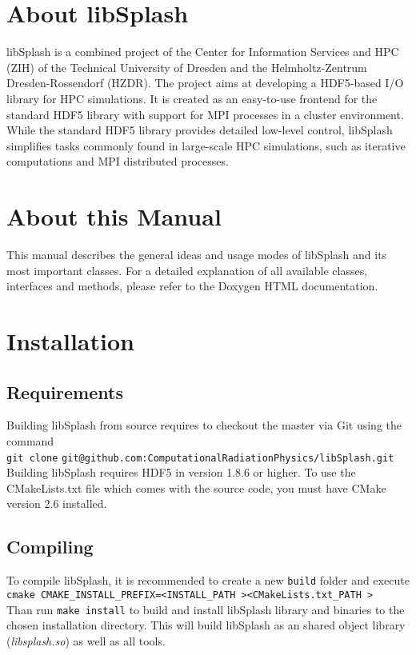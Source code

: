 \documentclass[a4paper,10pt,BCOR12mm]{report}
\newcommand{\command}[1]{\small \texttt{#1}}
\begin{document}
\section{About libSplash}

libSplash is a combined project of the Center for Information Services and HPC (ZIH) of the Technical University of Dresden and the Helmholtz-Zentrum Dresden-Rossendorf (HZDR).
The project aims at developing a HDF5-based I/O library for HPC simulations. It is created as an easy-to-use frontend for the standard HDF5 library with support for MPI processes in a cluster environment.
While the standard HDF5 library provides detailed low-level control, libSplash simplifies tasks commonly found in large-scale HPC simulations, such as iterative computations and MPI distributed processes.

\section{About this Manual}

This manual describes the general ideas and usage modes of libSplash and its most important classes.
For a detailed explanation of all available classes, interfaces and methods, please refer to the
Doxygen HTML documentation.

\newpage

\section{Installation}

\subsection{Requirements}

Building libSplash from source requires to checkout the master via Git using the command\\
\command{git clone} \command{git@github.com:ComputationalRadiationPhysics/libSplash.git}
Building libSplash requires HDF5 in version 1.8.6 or higher.
To use the CMakeLists.txt file which comes with the source code,
you must have CMake version 2.6 installed.

\subsection{Compiling}

To compile libSplash, it is recommended to create a new \command{build} folder
and execute \command{cmake CMAKE\_INSTALL\_PREFIX=\textless INSTALL\_PATH \textgreater \textless CMakeLists.txt\_PATH \textgreater}\\
Than run \command{make install} to build and install libSplash library and binaries to the chosen installation directory.
This will build libSplash as an shared object library (\emph{libsplash.so}) as well as all tools.
\end{document}
